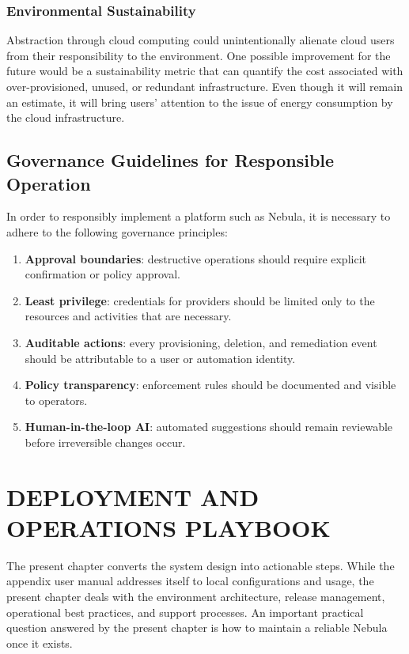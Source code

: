 \subsection{Environmental Sustainability}
Abstraction through cloud computing could unintentionally alienate cloud users from their responsibility to the environment. One possible improvement for the future would be a sustainability metric that can quantify the cost associated with over-provisioned, unused, or redundant infrastructure. Even though it will remain an estimate, it will bring users' attention to the issue of energy consumption by the cloud infrastructure.

\section{Governance Guidelines for Responsible Operation}
In order to responsibly implement a platform such as Nebula, it is necessary to adhere to the following governance principles:
\begin{enumerate}
    \item \textbf{Approval boundaries}: destructive operations should require explicit confirmation or policy approval.
    \item \textbf{Least privilege}:  credentials for providers should be limited only to the resources and activities that are necessary.
    \item \textbf{Auditable actions}: every provisioning, deletion, and remediation event should be attributable to a user or automation identity.
    \item \textbf{Policy transparency}: enforcement rules should be documented and visible to operators.
    \item \textbf{Human-in-the-loop AI}: automated suggestions should remain reviewable before irreversible changes occur.
\end{enumerate}

\newpage
\chapter{DEPLOYMENT AND OPERATIONS PLAYBOOK}

The present chapter converts the system design into actionable steps. While the appendix user manual addresses itself to local configurations and usage, the present chapter deals with the environment architecture, release management, operational best practices, and support processes. An important practical question answered by the present chapter is how to maintain a reliable Nebula once it exists.

